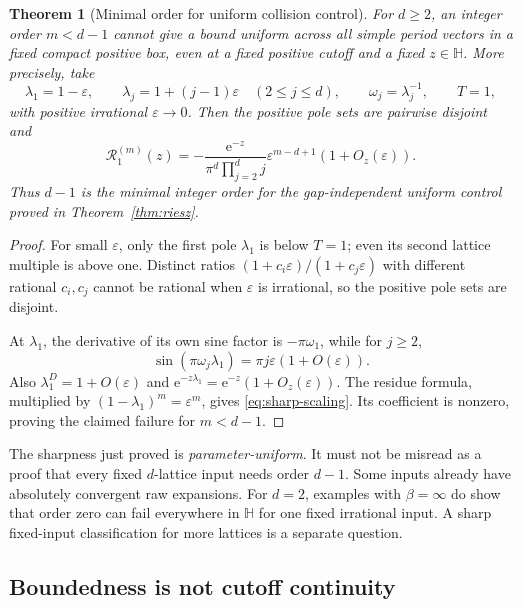 \documentclass[11pt,a4paper]{article}
\numberwithin{equation}{section}
\newtheorem{theorem}{Theorem}[section]
\theoremstyle{definition}
\theoremstyle{remark}
\newcommand{\e}{\mathrm e}
\newcommand{\Hh}{\mathbb H}
\newcommand{\Riesz}{\mathcal R}
\begin{document}
\begin{theorem}[Minimal order for uniform collision control]
\label{thm:sharp}
For $d\ge2$, an integer order $m<d-1$ cannot give a bound uniform
across all simple period vectors in a fixed compact positive box, even
at a fixed positive cutoff and a fixed $z\in\Hh$. More precisely, take
\begin{equation}
 \lambda_1=1-\varepsilon,\qquad
 \lambda_j=1+(j-1)\varepsilon\quad(2\le j\le d),\qquad
 \omega_j=\lambda_j^{-1},\qquad T=1,
 \label{eq:collision-family}
\end{equation}
with positive irrational $\varepsilon\to0$. Then the positive pole sets
are pairwise disjoint and
\begin{equation}
 \Riesz_1^{(m)}(z)
 =-\frac{\e^{-z}}{\pi^d\prod_{j=2}^d j}
       \varepsilon^{m-d+1}(1+O_z(\varepsilon)).
 \label{eq:sharp-scaling}
\end{equation}
Thus $d-1$ is the minimal integer order for the gap-independent uniform
control proved in Theorem~\ref{thm:riesz}.
\end{theorem}
\begin{proof}
For small $\varepsilon$, only the first pole $\lambda_1$ is below
$T=1$; even its second lattice multiple is above one. Distinct ratios
$(1+c_i\varepsilon)/(1+c_j\varepsilon)$ with different rational
$c_i,c_j$ cannot be rational when $\varepsilon$ is irrational, so the
positive pole sets are disjoint.

At $\lambda_1$, the derivative of its own sine factor is
$-\pi\omega_1$, while for $j\ge2$,
\[
 \sin(\pi\omega_j\lambda_1)
   =\pi j\varepsilon(1+O(\varepsilon)).
\]
Also $\lambda_1^D=1+O(\varepsilon)$ and
$\e^{-z\lambda_1}=\e^{-z}(1+O_z(\varepsilon))$.
The residue formula, multiplied by
$(1-\lambda_1)^m=\varepsilon^m$, gives
\eqref{eq:sharp-scaling}. Its coefficient is nonzero, proving the
claimed failure for $m<d-1$.
\end{proof}

The sharpness just proved is \emph{parameter-uniform}. It must not be
misread as a proof that every fixed $d$-lattice input needs order $d-1$.
Some inputs already have absolutely convergent raw expansions. For
$d=2$, examples with $\beta=\infty$ do show that order zero can fail
everywhere in $\Hh$ for one fixed irrational input. A sharp fixed-input
classification for more lattices is a separate question.

\subsection{Boundedness is not cutoff continuity}
\end{document}
